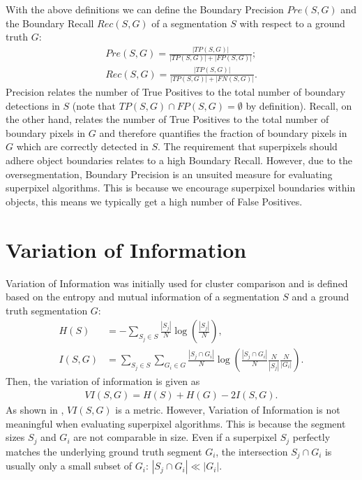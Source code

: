 With the above definitions we can define the Boundary Precision $Pre(S,G)$ and the Boundary Recall $Rec(S,G)$ of a segmentation $S$ with respect to a ground truth $G$:
\begin{align}
	Pre(S,G) = \frac{|TP(S, G)|}{|TP(S, G)| + |FP(S, G)|};\\
	Rec(S,G) = \frac{|TP(S, G)|}{|TP(S, G)| + |FN(S, G)|}.
\end{align}
Precision relates the number of True Positives to the total number of boundary detections in $S$ (note that $TP(S, G) \cap FP(S, G) = \emptyset$ by definition). Recall, on the other hand, relates the number of True Positives to the total number of boundary pixels in $G$ and therefore quantifies the fraction of boundary pixels in $G$ which are correctly detected in $S$. The requirement that superpixels should adhere object boundaries relates to a high Boundary Recall. However, due to the oversegmentation, Boundary Precision is an unsuited measure for evaluating superpixel algorithms. This is because we encourage superpixel boundaries within objects, this means we typically get a high number of False Positives.

\section{Variation of Information}

Variation of Information was initially used for cluster comparison \cite{Meila:2005} and is defined based on the entropy and mutual information of a segmentation $S$ and a ground truth segmentation $G$:
\begin{align}
	H(S) &= -\sum_{S_j \in S} \frac{|S_j|}{N} \log \left(\frac{|S_j|}{N}\right),\\
	I(S, G) &= \sum_{S_j \in S} \sum_{G_i \in G} \frac{|S_j \cap G_i|}{N} \log \left(\frac{|S_j \cap G_i|}{N} \frac{N}{|S_j|} \frac{N}{|G_i|} \right).
\end{align}
Then, the variation of information is given as
\begin{align}
	VI(S, G) = H(S) + H(G) - 2I(S, G).
\end{align}
As shown in \cite{Meila:2003}, $VI(S, G)$ is a metric. However, Variation of Information is not meaningful when evaluating superpixel algorithms. This is because the segment sizes $S_j$ and $G_i$ are not comparable in size. Even if a superpixel $S_j$ perfectly matches the underlying ground truth segment $G_i$, the intersection $S_j \cap G_i$ is usually only a small subset of $G_i$: $|S_j \cap G_i| \ll |G_i|$.

